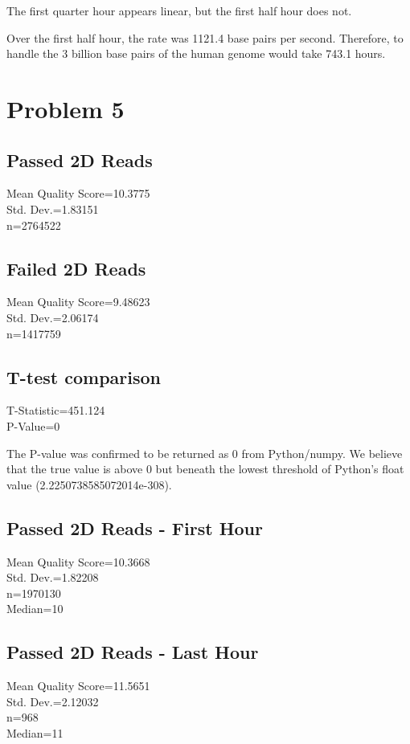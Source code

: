 \documentclass[11pt]{article}
\begin{document}
The first quarter hour appears linear, but the first half hour does not.


Over the first half hour, the rate was 1121.4 base pairs per second.  Therefore, to handle the 3 billion base pairs of the human genome would take 743.1 hours.
\section*{Problem 5}
\subsection*{Passed 2D Reads}
Mean Quality Score=10.3775\\  Std. Dev.=1.83151\\ n=2764522\\

\subsection*{Failed 2D Reads}
Mean Quality Score=9.48623\\  Std. Dev.=2.06174\\ n=1417759\\

\subsection*{T-test comparison}
T-Statistic=451.124\\
P-Value=0


The P-value was confirmed to be returned as 0 from Python/numpy.
We believe that the true value is above 0 but beneath the lowest threshold of Python's float value (2.2250738585072014e-308).

\subsection*{Passed 2D Reads - First Hour}
Mean Quality Score=10.3668\\  Std. Dev.=1.82208\\ n=1970130\\
Median=10

\subsection*{Passed 2D Reads - Last Hour}
Mean Quality Score=11.5651\\  Std. Dev.=2.12032\\ n=968\\
Median=11
\end{document}
